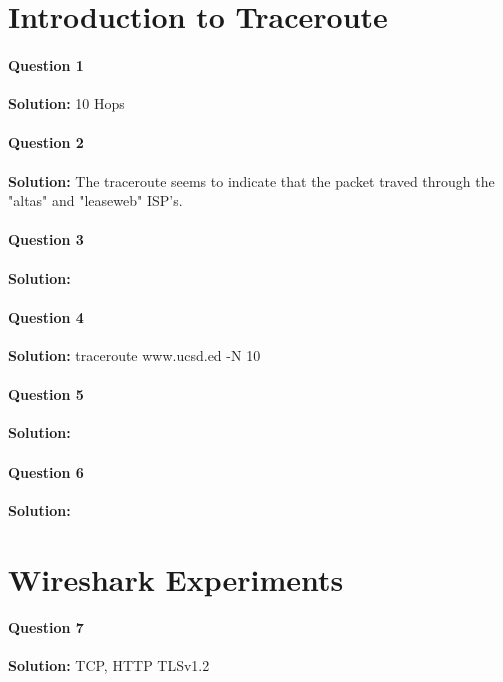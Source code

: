 \documentclass[12pt]{article}
\title{\hwTitle}
\author{Daniel Andronov}
\date{\displaydate{date}}
\begin{document}
\maketitle
\newpage


\section{Introduction to Traceroute}
\paragraph{Question 1\\}
\textbf{Solution: }
10 Hops

\paragraph{Question 2\\}
\textbf{Solution: }
The traceroute seems to indicate that the packet traved through the "altas" and "leaseweb" ISP's. 

\paragraph{Question 3\\}
\textbf{Solution: }

\paragraph{Question 4\\}
\textbf{Solution: }
traceroute www.ucsd.ed -N 10

\paragraph{Question 5\\}
\textbf{Solution: }

\paragraph{Question 6\\}
\textbf{Solution: }


\section{Wireshark Experiments}
\paragraph{Question 7\\}
\textbf{Solution: }
TCP, HTTP TLSv1.2
\end{document}
